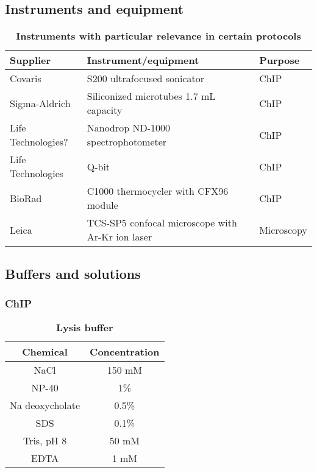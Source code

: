 \documentclass[11pt,twoside,a4paper]{report}
\begin{document}
    		\subsection{Instruments and equipment}
			\begin{table}[H]
       		\caption{\bf{Instruments with particular relevance in certain protocols}}
        		\begin{center}
            		\begin{tabular}{| p{2cm} | p{8cm} | p{3cm} |}
                		\hline
	               		\textbf{Supplier} & \textbf{Instrument/equipment} & \textbf{Purpose}\\
    		            \hline
						Covaris & S200 ultrafocused sonicator & ChIP\\
						\hline
						Sigma-Aldrich & Siliconized microtubes 1.7 mL capacity& ChIP\\
						\hline
						Life Technologies? & Nanodrop ND-1000 spectrophotometer & ChIP\\
						\hline
						Life Technologies & Q-bit & ChIP\\
						\hline
						BioRad & C1000 thermocycler with CFX96 module & ChIP\\
						\hline
						Leica & TCS-SP5 confocal microscope with Ar-Kr ion laser & Microscopy\\
	               		 \hline
	            \end{tabular}
    		    \end{center}
		    \end{table}
		    
		\subsection{Buffers and solutions}
			\subsubsection{ChIP}
			
				\begin{table}[H]
       			\caption{\bf{Lysis buffer}}
	        		\begin{center}
    		        		\begin{tabular}{|c|c|}
        		        		\hline
	    	    		        \textbf{Chemical} & \textbf{Concentration}\\
    		        		    \hline
								NaCl & 150 mM\\
    		        		    \hline
								NP-40 & 1\%\\
    		        		    \hline
								Na deoxycholate & 0.5\%\\
	   		        		    \hline
								SDS & 0.1\%\\
								\hline
								Tris, pH 8 & 50 mM\\
								\hline
								EDTA & 1 mM\\							
		               			 \hline
		            		\end{tabular}
    			    	\end{center}
			   		 \end{table}
			   		 
\end{document}
